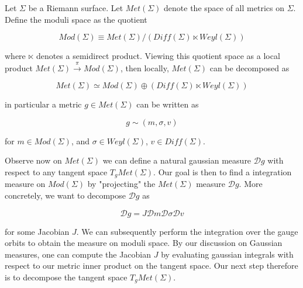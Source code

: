Let $\Sigma$ be a Riemann surface. Let $Met(\Sigma)$ denote the space of all metrics on $\Sigma$. Define the moduli space as the quotient

\begin{equation}
    Mod(\Sigma) \equiv Met(\Sigma)/(Diff(\Sigma) \ltimes Weyl(\Sigma))
\end{equation}

where $\ltimes$ denotes a semidirect product. Viewing this quotient space as a local product $Met(\Sigma) \xrightarrow{\pi} Mod(\Sigma)$, then locally, $Met(\Sigma)$ can be decomposed as

\begin{equation}
    Met(\Sigma) \simeq Mod(\Sigma)  \oplus (Diff(\Sigma) \ltimes Weyl(\Sigma))
\end{equation}

in particular a metric $g \in Met(\Sigma)$ can be written as

\begin{equation}
    g \sim (m, \sigma, v)
\end{equation}

for $m \in Mod(\Sigma)$, and $\sigma \in Weyl(\Sigma)$, $ v \in Diff(\Sigma)$.

Observe now on $Met(\Sigma)$ we can define a natural gaussian measure $\mathcal{D}g$ with respect to any tangent space $T_g Met(\Sigma)$. Our goal is then to find a integration measure on $Mod(\Sigma)$ by "projecting" the $Met(\Sigma)$ measure $\mathcal D g$. More concretely, we want to decompose $\mathcal D g$ as

\begin{equation}
    \mathcal D g = J \mathcal D m \mathcal D \sigma \mathcal D v
    \label{eq:measure-decomp}
\end{equation}

for some Jacobian $J$. We can subsequently perform the integration over the gauge orbits to obtain the measure on moduli space. By our discussion on Gaussian measures, one can compute the Jacobian $J$ by evaluating gaussian integrals with respect to our metric inner product on the tangent space. Our next step therefore is to decompose the tangent space $T_g Met(\Sigma)$.
